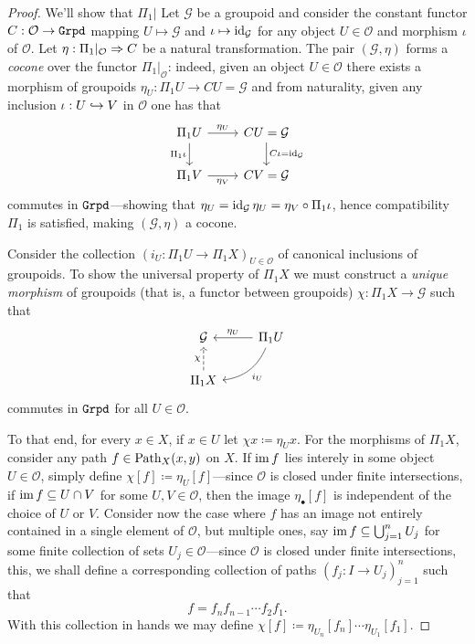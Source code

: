 \begin{proof}
    We'll show that \(\Pi_1|\) Let \(\mathcal{G}\) be a groupoid and consider the
    constant functor \(C: \mathcal{O} \to {\texttt{Grpd}}\) mapping \(U \mapsto \mathcal{G}\)
    and \(\iota \mapsto \operatorname{id}_{\mathcal{G}}\) for any object \(U \in \mathcal{O}\) and
    morphism \(\iota\) of \(\mathcal{O}\). Let \(\eta: \Pi_1|_{\mathcal{O}} \Rightarrow C\)
    be a natural transformation. The pair \((\mathcal{G}, \eta)\) forms a
    \emph{cocone} over the functor \(\Pi_1|_{\mathcal{O}}\): indeed, given an object
    \(U \in \mathcal{O}\) there exists a morphism of groupoids
    \(\eta_U: \Pi_1 U \to C U = \mathcal{G}\) and from naturality, given any
    inclusion \(\iota: U \hookrightarrow V\) in \(\mathcal{O}\) one has that
    \[
        \begin{tikzcd}
            \Pi_1 U \ar[d, "\Pi_1 \iota"'] \ar[r, "\eta_U"]
            &C U = \mathcal{G} \ar[d, "C \iota = \Id_{\mathcal{G}}"] \\
            \Pi_1 V \ar[r, "\eta_V"'] &C V = \mathcal{G}
        \end{tikzcd}
    \]
    commutes in \({\texttt{Grpd}}\)---showing that
    \(\eta_U = \operatorname{id}_{\mathcal{G}} \eta_U = \eta_V \circ \Pi_1 \iota\), hence
    compatibility \(\Pi_1\) is satisfied, making \((\mathcal{G}, \eta)\) a cocone.

    Consider the collection \((i_U: \Pi_1 U \to \Pi_1 X)_{U \in \mathcal{O}}\) of
    canonical inclusions of groupoids. To show the universal property of \(\Pi_1 X\)
    we must construct a \emph{unique morphism} of groupoids (that is, a functor
    between groupoids) \(\chi: \Pi_1 X \to \mathcal{G}\) such that
    \begin{equation}\label{eq:van-kampen-grpd}
        \begin{tikzcd}
            \mathcal{G} &\Pi_1 U \ar[l, "\eta_U"'] \ar[dl, bend left, "i_U"] \\
            \Pi_1 X \ar[u, dashed, "\chi"] &
        \end{tikzcd}
    \end{equation}
    commutes in \({\texttt{Grpd}}\) for all \(U \in \mathcal{O}\).

    To that end, for every \(x \in X\), if \(x \in U\) let
    \(\chi x \coloneq \eta_U x\). For the morphisms of \(\Pi_1 X\), consider any
    path \(f \in \operatorname{Path}_X(x, y)\) on \(X\). If \(\operatorname{im} f\) lies interely in some object
    \(U \in \mathcal{O}\), simply define \(\chi [f] \coloneq \eta_U [f]\)---since
    \(\mathcal{O}\) is closed under finite intersections, if
    \(\operatorname{im} f \subseteq U \cap V\) for some \(U, V \in \mathcal{O}\), then the image
    \(\eta_{\bullet} [f]\) is independent of the choice of \(U\) or \(V\). Consider
    now the case where \(f\) has an image not entirely contained in a single element
    of \(\mathcal{O}\), but multiple ones, say
    \(\operatorname{im} f \subseteq \bigcup_{j=1}^n U_j\) for some finite collection of sets
    \(U_j \in \mathcal{O}\)---since \(\mathcal{O}\) is closed under finite
    intersections, this, we shall define a corresponding collection of paths
    \((f_j: I \to U_j)_{j=1}^n\) such that
    \[
        f = f_n f_{n-1} \cdots f_2 f_1.
    \]
    With this collection in hands we may define
    \(\chi[f] \coloneq \eta_{U_n}[f_n] \cdots \eta_{U_1}[f_1]\).


\end{proof}
